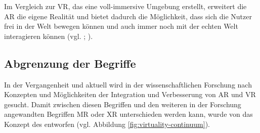 



Im Vergleich zur \ac{VR}, das eine voll-immersive Umgebung erstellt, erweitert die \ac{AR} die eigene Realität und bietet dadurch die Möglichkeit, dass sich die Nutzer frei in der Welt bewegen können und auch immer noch mit der echten Welt interagieren können (vgl. \citealp[S. 79]{billinghurst_survey_2015}; \citealp[S. 1]{stefanidi_meaningful_2024}).

\subsection{Abgrenzung der Begriffe}
In der Vergangenheit und aktuell wird in der wissenschaftlichen Forschung nach Konzepten und Möglichkeiten der Integration und Verbesserung von \ac{AR} und \ac{VR} gesucht. Damit zwischen diesen Begriffen und den weiteren in der Forschung angewandten Begriffen \ac{MR} oder \ac{XR} unterschieden werden kann, wurde von  \cite{milgram_taxonomy_1994} das Konzept des  entworfen (vgl. Abbildung \ref{fig:virtuality-continuum}).

